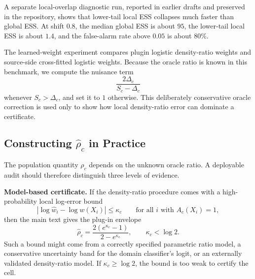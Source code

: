 A separate local-overlap diagnostic run, reported in earlier drafts and preserved in the repository, shows that lower-tail local ESS collapses much faster than global ESS. At shift \(0.8\), the median global ESS is about \(95\), the lower-tail local ESS is about \(1.4\), and the false-alarm rate above \(0.05\) is about \(80\%\).

The learned-weight experiment compares plugin logistic density-ratio weights and source-side cross-fitted logistic weights. Because the oracle ratio is known in this benchmark, we compute the nuisance term
\[
\frac{2\Delta_c}{S_c-\Delta_c}
\]
whenever \(S_c>\Delta_c\), and set it to \(1\) otherwise. This deliberately conservative oracle correction is used only to show how local density-ratio error can dominate a certificate.

\subsection{Constructing \texorpdfstring{\(\widehat\rho_c\)}{rho-c} in Practice}

The population quantity \(\rho_c\) depends on the unknown oracle ratio. A deployable audit should therefore distinguish three levels of evidence.

\textbf{Model-based certificate.} If the density-ratio procedure comes with a high-probability local log-error bound
\[
\left|\log \widehat w_i-\log w(X_i)\right|\le\kappa_c
\qquad\text{for all }i\text{ with }A_c(X_i)=1,
\]
then the main text gives the plug-in envelope
\[
\widehat\rho_c
=
\frac{2(e^{\kappa_c}-1)}{2-e^{\kappa_c}},
\qquad
\kappa_c<\log 2.
\]
Such a bound might come from a correctly specified parametric ratio model, a conservative uncertainty band for the domain classifier's logit, or an externally validated density-ratio model. If \(\kappa_c\ge\log2\), the bound is too weak to certify the cell.

